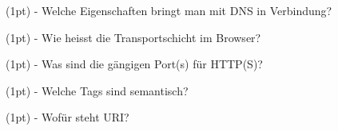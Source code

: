 \documentclass[10pt,ngerman]{examdesign}
\begin{document}
\begin{multiplechoice}

  \begin{question}
    (1pt) - Welche Eigenschaften bringt man mit DNS in Verbindung?
    \smallskip
  \end{question}

  \begin{question}
    (1pt) - Wie heisst die Transportschicht im Browser?
    \smallskip
  \end{question}

  \begin{question}
    (1pt) - Was sind die gängigen Port(s) für HTTP(S)?
    \smallskip
  \end{question}

  \begin{question}
    (1pt) - Welche Tags sind semantisch?
    \smallskip
  \end{question}

  \begin{question}
    (1pt) - Wof\"ur steht URI?
    \smallskip
  \end{question}

\end{multiplechoice}
\end{document}
